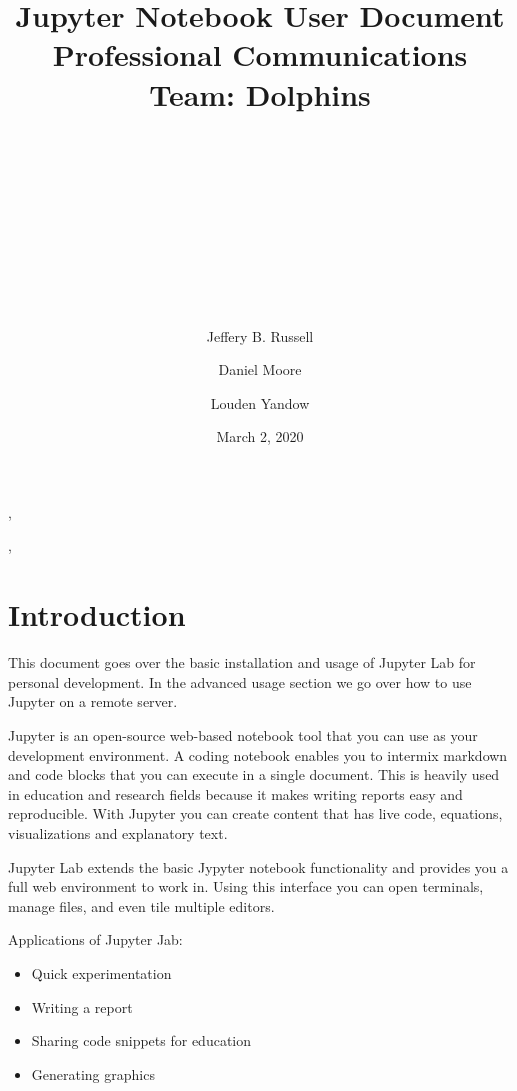 \documentclass[pdftex,12pt]{artikel3}
\title{
\begin{center}
\huge{Jupyter Notebook User Document} \\
\huge{Professional Communications}\\
\newline
\huge{Team: Dolphins}\\
\end{center}
\\
\\
\\
\\
\author{} %
\date{}   %
}
\begin{document}
\maketitle


\begin{center}

\author{Jeffery B. Russell},
\author{Daniel Moore},
\author{Louden Yandow}

\date{March 2, 2020}
\end{center}

\newpage

\tableofcontents
{}
\newpage
\listoffigures
{}

\newpage

\section{Introduction}

This document goes over the basic installation and usage of Jupyter Lab for personal development. 
In the advanced usage section we go over how to use Jupyter on a remote server. 

Jupyter  is an open-source web-based notebook tool that you can use as your development environment.
A coding notebook enables you to intermix markdown and code blocks that you can execute in a single document. This is heavily used in education and research fields because it makes writing reports easy and reproducible. With Jupyter you can create content that has live code, equations, visualizations and explanatory text.

Jupyter Lab extends the basic Jypyter notebook functionality and provides you a full web environment to work in. Using this interface you can open terminals, manage files, and even tile multiple editors.

Applications of Jupyter Jab:

\begin{itemize}
  \item Quick experimentation
  \item Writing a report
  \item Sharing code snippets for education
  \item Generating graphics
\end{itemize}
\end{document}
